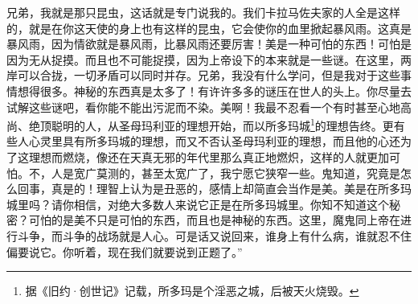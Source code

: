 \par 兄弟，我就是那只昆虫，这话就是专门说我的。我们卡拉马佐夫家的人全是这样的，就是在你这天使的身上也有这样的昆虫，它会使你的血里掀起暴风雨。这真是暴风雨，因为情欲就是暴风雨，比暴风雨还要厉害！美是一种可怕的东西！可怕是因为无从捉摸。而且也不可能捉摸，因为上帝设下的本来就是一些谜。在这里，两岸可以合拢，一切矛盾可以同时并存。兄弟，我没有什么学问，但是我对于这些事情想得很多。神秘的东西真是太多了！有许许多多的谜压在世人的头上。你尽量去试解这些谜吧，看你能不能出污泥而不染。美啊！我最不忍看一个有时甚至心地高尚、绝顶聪明的人，从圣母玛利亚的理想开始，而以所多玛城\footnote{据《旧约·创世记》记载，所多玛是个淫恶之城，后被天火烧毁。}的理想告终。更有些人心灵里具有所多玛城的理想，而又不否认圣母玛利亚的理想，而且他的心还为了这理想而燃烧，像还在天真无邪的年代里那么真正地燃炽，这样的人就更加可怕。不，人是宽广莫测的，甚至太宽广了，我宁愿它狭窄一些。鬼知道，究竟是怎么回事，真是的！理智上认为是丑恶的，感情上却简直会当作是美。美是在所多玛城里吗？请你相信，对绝大多数人来说它正是在所多玛城里。你知不知道这个秘密？可怕的是美不只是可怕的东西，而且也是神秘的东西。这里，魔鬼同上帝在进行斗争，而斗争的战场就是人心。可是话又说回来，谁身上有什么病，谁就忍不住偏要说它。你听着，现在我们就要说到正题了。”
